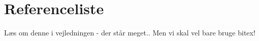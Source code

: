 \chapter{Referenceliste}

Læs om denne i vejledningen - der står meget.. Men vi skal vel bare bruge bitex! 